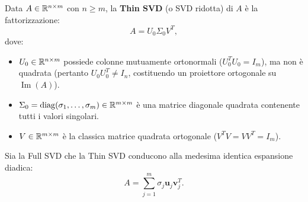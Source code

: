\begin{definition}
\label{def:thin-svd}
Data $A \in \mathbb{R}^{n \times m}$ con $n \ge m$, la \textbf{Thin SVD} (o SVD ridotta) di $A$ \`e la fattorizzazione:
\begin{equation}
    A = U_0 \Sigma_0 V^T,
\end{equation}
dove:
\begin{itemize}
    \item $U_0 \in \mathbb{R}^{n \times m}$ possiede colonne mutuamente ortonormali ($U_0^T U_0 = I_m$), ma non \`e quadrata (pertanto $U_0 U_0^T \neq I_n$, costituendo un proiettore ortogonale su $\operatorname{Im}(A)$).
    \item $\Sigma_0 = \operatorname{diag}(\sigma_1, \dots, \sigma_m) \in \mathbb{R}^{m \times m}$ \`e una matrice diagonale quadrata contenente tutti i valori singolari.
    \item $V \in \mathbb{R}^{m \times m}$ \`e la classica matrice quadrata ortogonale ($V^T V = V V^T = I_m$).
\end{itemize}
\end{definition}

Sia la Full SVD che la Thin SVD conducono alla medesima identica espansione diadica:
\begin{equation}
    A = \sum_{j=1}^m \sigma_j \mathbf{u}_j \mathbf{v}_j^T.
\end{equation}

